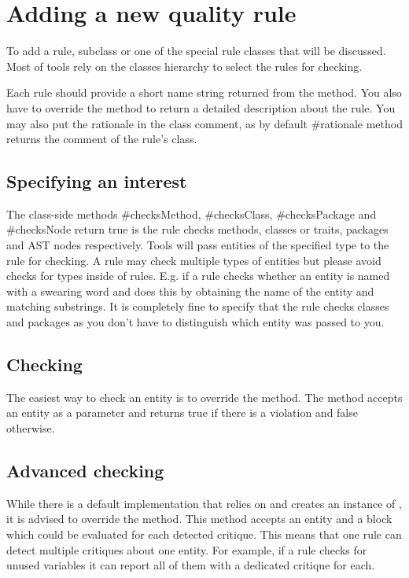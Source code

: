 \documentclass[10pt,twoside,english]{_support/latex/sbabook/sbabook}
\begin{document}
\frontmatter
\pagestyle{plain}

\tableofcontents*
\clearpage\listoffigures

\mainmatter


\chapter{Adding a new quality rule}
To add a rule, subclass  or one of the special rule classes that will be discussed. Most of tools rely on the classes hierarchy to select the rules for checking.

Each rule should provide a short name string returned from the  method. You also have to override the  method to return a detailed description about the rule. You may also put the rationale in the class comment, as by default \#rationale method returns the comment of the rule's class.

\section{Specifying an interest}
The class-side methods \#checksMethod, \#checksClass, \#checksPackage and \#checksNode return true is the rule checks methods, classes or traits, packages and AST nodes respectively. Tools will pass entities of the specified type to the rule for checking. A rule may check multiple types of entities but please avoid checks for types inside of rules. E.g. if a rule checks whether an entity is named with a swearing word and does this by obtaining the name of the entity and matching substrings. It is completely fine to specify that the rule checks classes and packages as you don't have to distinguish which entity was passed to you.

\section{Checking}
The easiest way to check an entity is to override the  method. The method accepts an entity as a parameter and returns true if there is a violation and false otherwise.

\section{Advanced checking}
While there is a default implementation that relies on  and creates an instance of , it is advised to override the  method. This method accepts an entity and a block which could be evaluated for each detected critique. This means that one rule can detect multiple critiques about one entity. For example, if a rule checks for unused variables it can report all of them with a dedicated critique for each.
\end{document}

